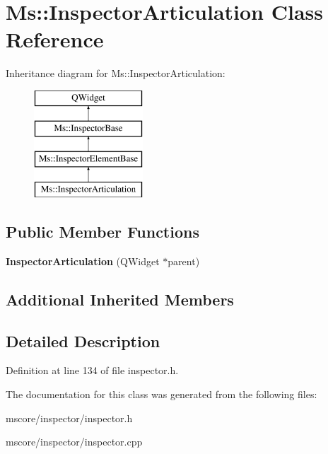 \hypertarget{class_ms_1_1_inspector_articulation}{}\section{Ms\+:\+:Inspector\+Articulation Class Reference}
\label{class_ms_1_1_inspector_articulation}
Inheritance diagram for Ms\+:\+:Inspector\+Articulation\+:\begin{figure}[H]
\begin{center}
\leavevmode
\includegraphics[height=4.000000cm]{class_ms_1_1_inspector_articulation}
\end{center}
\end{figure}
\subsection*{Public Member Functions}
\begin{DoxyCompactItemize}
\item 
\mbox{\label{class_ms_1_1_inspector_articulation_a3163e050ad5615d03c5a4a5c46f66d9f}} 
{\bfseries Inspector\+Articulation} (Q\+Widget $\ast$parent)
\end{DoxyCompactItemize}
\subsection*{Additional Inherited Members}


\subsection{Detailed Description}


Definition at line 134 of file inspector.\+h.



The documentation for this class was generated from the following files\+:\begin{DoxyCompactItemize}
\item 
mscore/inspector/inspector.\+h\item 
mscore/inspector/inspector.\+cpp\end{DoxyCompactItemize}
